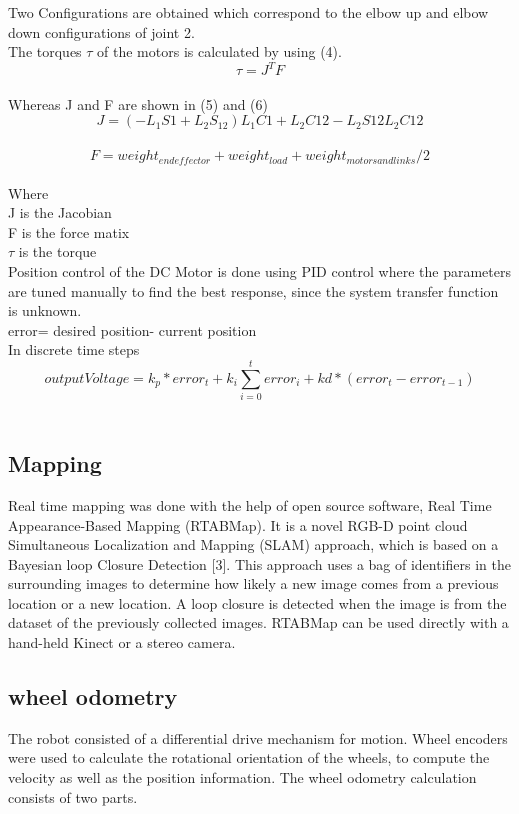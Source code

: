 \documentclass[conference]{IEEEtran}
\begin{document}
Two Configurations are obtained which correspond to the elbow up and elbow down configurations of joint 2.\\
The torques $\tau$ of the motors is calculated by using (4).\\
\begin{equation} \label{eq:4}
\tau=J^TF
\end{equation}\\
Whereas J and F are shown in (5) and (6)
\begin{equation} \label{eq:5}
J=(-L_1S1+L_2S_12)L_1C1+L_2C12-L_2S12L_2C12
\end{equation}\\
\begin{equation} \label{eq:6}
F=weight_{end effector}+weight_{load}+weight_{motors and links}/2
\end{equation}\\

Where\\
J is the Jacobian\\
F is the force matix\\
$\tau$ is the torque\\
Position control of the DC Motor is done using PID control where the parameters are tuned manually to find the best response, since the system transfer function is unknown.\\
error= desired position- current position\\
In discrete time steps\\
\begin{equation} \label{eq:7}
output Voltage=k_p*error_t+k_i\sum_{i=0}^{t}error_i+kd*(error_t-error_{t-1})
\end{equation}\\
\subsection{Mapping}
Real time mapping was done with the help of open source software, Real Time Appearance-Based Mapping (RTABMap). It is a novel RGB-D point cloud Simultaneous Localization and Mapping (SLAM) approach, which is based on a Bayesian loop Closure Detection [3]. This approach uses a bag of identifiers in the surrounding images to determine how likely a new image comes from a previous location or a new location. A loop closure is detected when the image is from the dataset of the previously collected images. RTABMap can be used directly with a hand-held Kinect or a stereo camera.
\subsection{wheel odometry}
The robot consisted of a differential drive mechanism for motion. Wheel encoders were used to calculate the rotational orientation of the wheels, to compute the velocity as well as the position information. The wheel odometry calculation consists of two parts.
\end{document}
